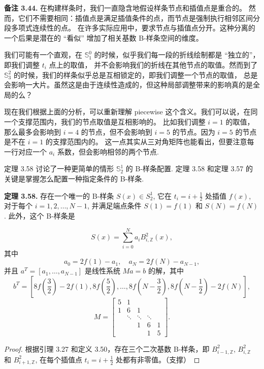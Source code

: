 \documentclass[a4paper]{ctexart}
\begin{document}
{\noindent \textbf{备注 3.44.} 在构建样条时，我们一直隐含地假设样条节点和插值点是重合的。
然而，它们不需要相同：插值点是满足插值条件的点，而节点是强制执行相邻区间分段多项式连续性的点。
在许多实际应用中，要求节点与插值点分开。这种分离的一个后果是潜在的 ``看似'' 增加了相关基数 B-样条空间的维度。

我们可能有一个直观，在 $\mathbb{S}_1^0$ 的时候，似乎我们每一段的折线绘制都是 ``独立的''，即我们调整 $t_i$ 点上的取值，
并不会影响我们的折线在其他节点的取值。然而到了 $\mathbb{S}_3^2$ 的时候，我们的样条似乎总是互相锁定的，即我们调整一个节点的取值，
总是会影响一大片。虽然这是由于连续性造成的，但这种局部调整带来的影响真的是全局的么？

现在我们根据上面的分析，可以重新理解 piecewise 这个含义。我们可以说，在同一个支撑范围内，我们的节点取值是互相影响的。
比如我们调整 $i = 1$ 的取值，那么最多会影响到 $i = 4$ 的节点，但不会影响到 $i = 5$ 的节点。因为 $i = 5$ 的节点是不在 $i = 1$ 的支撑范围内的。
这一点其实从三对角矩阵也能看出，但要注意每一行对应一个 $a_i$ 系数，但会影响相邻的两个节点.

定理 3.58 讨论了一种更简单的情形 $\mathbb{S}_2^1$ 的 B-样条配置. 定理
3.58 和定理 3.57 的关键是掌握怎么配置一种指定条件的 B-样条.

\noindent \textbf{定理 3.58.} 存在一个唯一的 B-样条 $S(x) \in S_{2}^{1}$, 它在 $t_{i} = i + \frac{1}{2}$ 处插值 $f(x)$, 
对于每个 $i = 1, 2, \ldots, N - 1$, 并满足端点条件 $S(1) = f(1)$ 和 $S(N) = f(N)$. 此外，这个 B-样条是

\[
S(x) = \sum_{i=0}^N a_i B_{i, \mathbb{Z}}^2(x), \tag{3.75}
\]
其中
\[ 
a_0 = 2f(1) - a_1, \quad a_N = 2f(N) - a_{N-1}, \tag{3.76}
\]
并且 $a^T = [a_{1}, \ldots, a_{N-1}]$ 是线性系统 $Ma = b$ 的解，其中
$$ b^T = \left[8f\left(\frac{3}{2}\right) - 2f(1), 8f\left(\frac{5}{2}\right), \ldots, 8f\left(N - \frac{3}{2}\right), 8f\left(N - \frac{1}{2}\right) - 2f(N)\right], $$
$$ M = \begin{bmatrix} 5 & 1 & & & \\ 1 & 6 & 1 & & \\ & \ddots & \ddots & \ddots & \\ & & 1 & 6 & 1 \\ & & & 1 & 5 \end{bmatrix}. $$


\begin{proof}
根据引理 3.27 和定义 3.50，存在三个二次基数 B-样条，即 $B_{i-1, \mathbb{Z}}^2$, 
$B_{i, \mathbb{Z}}^2$ 和 $B_{i+1, \mathbb{Z}}^2$, 在每个插值点 $t_i = i + \frac{1}{2}$ 处都有非零值。（支撑）


\end{proof}}
\end{document}
